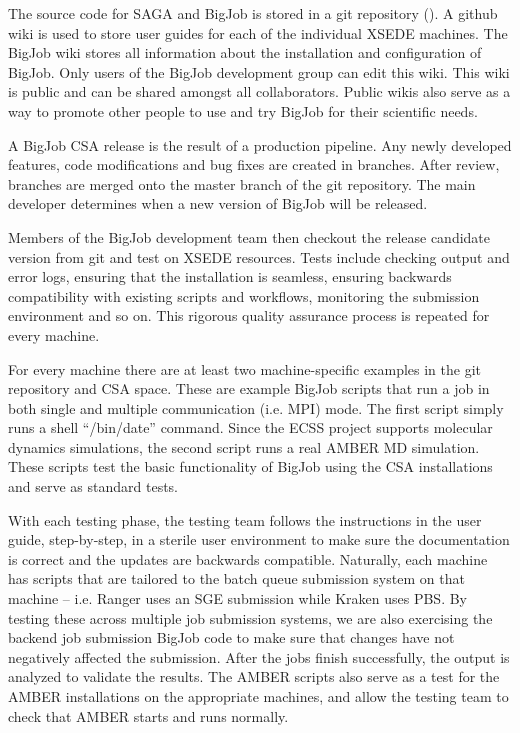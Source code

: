 \documentclass{sig-alternate}
\begin{document}
The source code for SAGA and BigJob is stored in a
git repository (\cite{bigjob_web}). A github wiki is used to store user guides
for each of the individual XSEDE machines. The BigJob wiki stores all
information about the installation and configuration of BigJob. Only users of
the BigJob development group can edit this wiki. This wiki is public and can be
shared amongst all collaborators. Public wikis also serve as a way to promote
other people to use and try BigJob for their scientific needs.

A BigJob CSA release is the result of a production pipeline. Any newly developed
features, code modifications and bug fixes are created in branches. After
review, branches are merged onto the master branch of the git repository. The
main developer determines when a new version of BigJob will be released. 

Members of the BigJob development team then checkout the release candidate
version from git and test on XSEDE resources. Tests include checking output and error logs, 
ensuring that the installation is seamless, ensuring backwards compatibility with existing 
scripts and workflows, monitoring the submission environment and so on. This rigorous quality 
assurance process is repeated for every machine.

For every machine there are at least two machine-specific examples in the
git repository and CSA space. These are example BigJob scripts that
run a job in both single and multiple communication (i.e. MPI)
mode. The first script simply runs a shell ``/bin/date''
command. Since the ECSS project supports molecular dynamics
simulations, the second script runs a real AMBER MD simulation. These
scripts test the basic functionality of BigJob using the CSA
installations and serve as standard tests.

With each testing phase, the testing team follows the instructions in the user
guide, step-by-step, in a sterile user environment to make sure the
documentation is correct and the updates are backwards compatible.
Naturally, each machine has scripts that are tailored to the batch queue submission
system on that machine -- i.e. Ranger uses an SGE submission while Kraken uses
PBS. By testing these across multiple job submission systems, we are also
exercising the backend job submission BigJob code to make sure that changes have
not negatively affected the submission. After the jobs finish successfully, the
output is analyzed to validate the results. The AMBER scripts also serve as a
test for the AMBER installations on the appropriate machines, and allow the
testing team to check that AMBER starts and runs normally.
\end{document}
